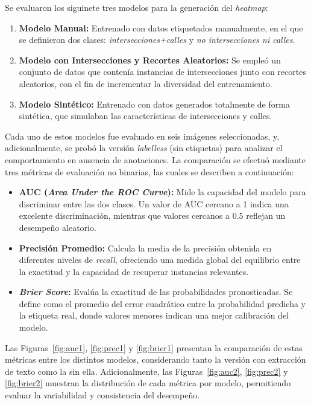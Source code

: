 \documentclass[twocolumn, fontsize=10pt]{article}
\begin{document}
Se evaluaron los siguinete tres modelos para la generaci\'on del \textit{heatmap}:
\begin{enumerate}
    \item \textbf{Modelo Manual:} Entrenado con datos etiquetados manualmente, en el que se definieron dos clases: \textit{intersecciones+calles} y \textit{no intersecciones ni calles}.
    \item \textbf{Modelo con Intersecciones y Recortes Aleatorios:} Se emple\'o un conjunto de datos que conten\'ia instancias de intersecciones junto con recortes aleatorios, con el fin de incrementar la diversidad del entrenamiento.
    \item \textbf{Modelo Sint\'etico:} Entrenado con datos generados totalmente de forma sint\'etica, que simulaban las caracter\'isticas de intersecciones y calles.
\end{enumerate}

Cada uno de estos modelos fue evaluado en seis im\'agenes seleccionadas, y, adicionalmente, se prob\'o la versi\'on \textit{labelless} (sin etiquetas) para analizar el comportamiento en ausencia de anotaciones. La comparaci\'on se efectu\'o mediante tres m\'etricas de evaluaci\'on no binarias, las cuales se describen a continuaci\'on:

\begin{itemize}
    \item \textbf{AUC (\textit{Area Under the ROC Curve}):} \cite{auc} Mide la capacidad del modelo para discriminar entre las dos clases. Un valor de AUC cercano a 1 indica una excelente discriminaci\'on, mientras que valores cercanos a 0.5 reflejan un desempe\~no aleatorio.
    \item \textbf{Precisi\'on Promedio:} \cite{precission} Calcula la media de la precisi\'on obtenida en diferentes niveles de \textit{recall}, ofreciendo una medida global del equilibrio entre la exactitud y la capacidad de recuperar instancias relevantes.
    \item \textbf{\textit{Brier Score}:} \cite{brier} Eval\'ua la exactitud de las probabilidades pronosticadas. Se define como el promedio del error cuadr\'atico entre la probabilidad predicha y la etiqueta real, donde valores menores indican una mejor calibraci\'on del modelo.
\end{itemize}

Las Figuras~\ref{fig:auc1}, \ref{fig:prec1} y \ref{fig:brier1} 
presentan la comparaci\'on de estas m\'etricas 
entre los distintos modelos, considerando tanto 
la versi\'on con extracci\'on de texto como la 
sin ella. Adicionalmente, las Figuras~\ref{fig:auc2}, 
\ref{fig:prec2} y \ref{fig:brier2} muestran la 
distribuci\'on de cada m\'etrica por modelo, 
permitiendo evaluar la variabilidad y consistencia del 
desempe\~no.
\end{document}
